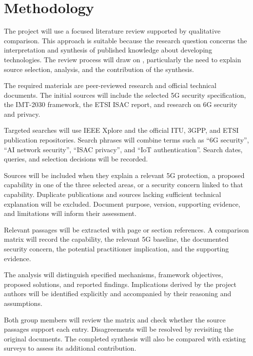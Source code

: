 \chapter{Methodology}
\label{ch:methodology}

The project will use a focused literature review supported
by qualitative comparison. This approach is suitable
because the research question concerns the interpretation
and synthesis of published knowledge about developing
technologies. The review process will draw on
\citet{snyder2019literaturereview}, particularly the need
to explain source selection, analysis, and the
contribution of the synthesis.

The required materials are peer-reviewed research
and official technical documents. The initial sources
will include the selected 5G security specification,
the IMT-2030 framework, the ETSI ISAC report, and
research on 6G security and privacy.

Targeted searches will use IEEE Xplore and the official
ITU, 3GPP, and ETSI publication repositories. Search
phrases will combine terms such as ``6G security'',
``AI network security'', ``ISAC privacy'', and
``IoT authentication''. Search dates, queries, and
selection decisions will be recorded.

Sources will be included when they explain a relevant
5G protection, a proposed capability in one of the three
selected areas, or a security concern linked to that
capability. Duplicate publications and sources lacking
sufficient technical explanation will be excluded.
Document purpose, version, supporting evidence,
and limitations will inform their assessment.

Relevant passages will be extracted with page or section
references. A comparison matrix will record the
capability, the relevant 5G baseline, the documented
security concern, the potential practitioner implication,
and the supporting evidence.

The analysis will distinguish specified mechanisms,
framework objectives, proposed solutions, and reported
findings. Implications derived by the project authors
will be identified explicitly and accompanied by their
reasoning and assumptions.

Both group members will review the matrix and check
whether the source passages support each entry.
Disagreements will be resolved by revisiting the
original documents. The completed synthesis will
also be compared with existing surveys to assess
its additional contribution.
